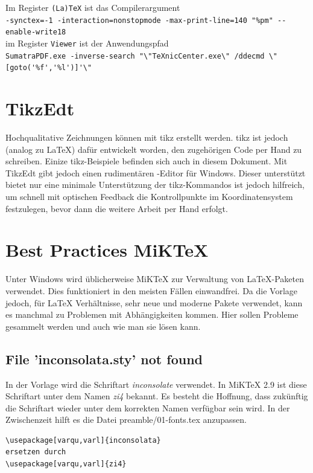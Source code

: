 Im Register \texttt{(La)TeX} ist das Compilerargument\\
{\small\verb#-synctex=-1 -interaction=nonstopmode -max-print-line=140 "%pm" --enable-write18#}\\
im Register \texttt{Viewer} ist der Anwendungspfad\\
{\small\verb#SumatraPDF.exe -inverse-search "\"TeXnicCenter.exe\" /ddecmd \"[goto('%f','%l')]'\"#}\\

\section{TikzEdt}

Hochqualitative Zeichnungen können mit \gls{tikz} erstellt werden. \Gls{tikz} ist jedoch
(analog zu LaTeX) dafür entwickelt worden, den zugehörigen Code per Hand zu
schreiben. Einize \gls{tikz}-Beispiele befinden sich auch in diesem Dokument.
Mit TikzEdt gibt jedoch einen rudimentären -Editor für Windows. Dieser
unterstützt bietet nur eine minimale Unterstützung der \gls{tikz}-Kommandos ist jedoch
hilfreich, um schnell mit optischen Feedback die Kontrollpunkte im
Koordinatensystem festzulegen, bevor dann die weitere Arbeit per Hand erfolgt.


\section{Best Practices MiKTeX}

Unter Windows wird üblicherweise MiKTeX zur Verwaltung von LaTeX-Paketen verwendet. 
Dies funktioniert in den meisten Fällen einwandfrei.
Da die Vorlage jedoch, für LaTeX Verhältnisse, sehr neue und moderne Pakete verwendet, kann es manchmal zu Problemen mit Abhängigkeiten kommen.
Hier sollen Probleme gesammelt werden und auch wie man sie lösen kann.

\subsection{File 'inconsolata.sty' not found}
In der Vorlage wird die Schriftart \emph{inconsolate} verwendet. In MiKTeX 2.9 ist diese Schriftart unter dem Namen \emph{zi4} bekannt.
Es besteht die Hoffnung, dass zukünftig die Schriftart wieder unter dem korrekten Namen verfügbar sein wird.
In der Zwischenzeit hilft es die Datei preamble/01-fonts.tex anzupassen.
\begin{verbatim}
\usepackage[varqu,varl]{inconsolata}
ersetzen durch
\usepackage[varqu,varl]{zi4}
\end{verbatim}

